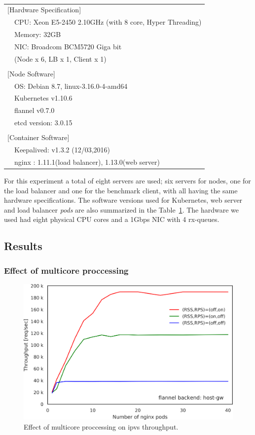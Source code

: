 \begin{table}[]
  \centering
  \begin{tabular}{ll}
    \hline 
    \multicolumn{2}{l}{[Hardware Specification]}   \\
    & CPU: Xeon E5-2450 2.10GHz (with 8 core, Hyper Threading) \\
    & Memory: 32GB \\
    & NIC: Broadcom BCM5720 Giga bit \\
    & (Node x 6, LB x 1, Client x 1) \\
    & \\
    \multicolumn{2}{l}{[Node Software]}  \\
    & OS: Debian 8.7, linux-3.16.0-4-amd64 \\
    & Kubernetes v1.10.6 \\
    & flannel v0.7.0 \\
    & etcd version: 3.0.15 \\
    & \\
    \multicolumn{2}{l}{[Container Software]}   \\
    & Keepalived: v1.3.2 (12/03,2016) \\
    & nginx : 1.11.1(load balancer), 1.13.0(web server) \\
    \hline
  \end{tabular}
  \caption{}
  \label{tab:hw_sw_spec}
\end{table}

For this experiment a total of eight servers are used; six servers for nodes, one for the load balancer and one for the benchmark client, with all having the same hardware specifications.
The software versions used for Kubernetes, web server and load balancer {\em pods} are also summarized in the Table~\ref{tab:hw_sw_spec}.
The hardware we used had eight physical CPU cores and a 1Gbps NIC with 4 rx-queues.

\subsection{Results}
\subsubsection{Effect of multicore proccessing}

\begin{figure}
  \centering
  \includegraphics[width=0.8\columnwidth]{Figs/ipvs_mcore_proccessing}
  \caption{Effect of multicore proccessing on ipvs throughput.}
  \label{fig:ipvs_mcore_proccessing}
\end{figure}

